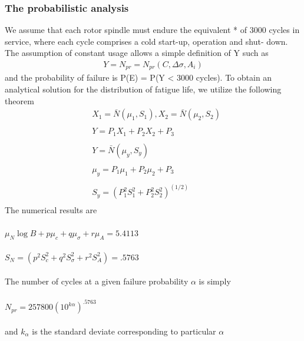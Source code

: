 \documentclass[12pt]{article}
\begin{document}
\subsubsection{The probabilistic analysis}
We assume that each rotor spindle must endure
the equivalent * of 3000 cycles in service, where each
cycle comprises a cold start-up, operation and shut-
down. The assumption of constant usage allows a
simple definition of Y such as
\begin{align*}
    Y = N_{pr} = N_{pr}(C, \Delta\sigma, A_i)
\end{align*}
and the probability of failure is P(E) = P(Y < 3000
cycles).
To obtain an analytical solution for the distribution of fatigue life, we utilize the following theorem
\begin{align*}
    &X_1 = \bar{N}(\mu_1, S_1),    X_2 = \bar{N}(\mu_2, S_2)\\
    \\&Y = P_1 X_1 + P_2 X_2 + P_3\\
    \\&Y = \bar{N}(\mu_y, S_y)\\
    \\&\mu_y = P_1 \mu_1 + P_2 \mu_2 + P_3\\
    \\&S_y = (P_1^2 S_1^2 + P_2^2 S_2^2)^(1/2)\\
\end{align*}
The numerical results are\\\\
$\mu_N \log B + p \mu_c + q \mu_\sigma + r\mu_A = 5.4113$\\\\
$S_N = (p^2 S_c^2 + q^2 S_\sigma^2 + r^2 S_A^2) = .5763$\\\\
The number of cycles at a given failure probability $\alpha$ is simply\\\\
$N_{pr} = 257800(10^{k \alpha})^{.5763}$\\\\
and $k_\alpha$ is the standard deviate corresponding to particular $\alpha$
\begin{figure}[H]
    \centering
    \captionsetup{labelformat=empty}  
\end{figure}
\end{document}
